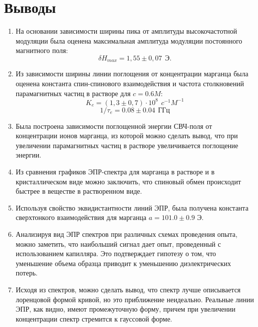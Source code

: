 \documentclass{article}
\begin{document}
\section{Выводы}
\begin{enumerate}
    \item На основании зависимости ширины пика от амплитуды высокочастотной модуляции была оценена максимальная амплитуда модуляции постоянного магнитного поля:
    \begin{equation*}
        \delta H_{max} = 1,55 \pm 0,07 \hspace{5pt} \text{Э}.
    \end{equation*}
    
    \item Из зависимости ширины линии поглощения от концентрации марганца была оценена константа спин-спинового взаимодействия и частота столкновений парамагнитных частиц в растворе для $c = 0.6 M$:
    \begin{equation*}
        K_e = (1,3  \pm 0,7) \cdot 10^8 \hspace{5pt} c^{-1}M^{-1}
    \end{equation*}
    \begin{equation*}
         1/\tau_e = 0.08 \pm 0.04 \hspace{5pt} \text{ГГц}
    \end{equation*}
    \item  Была построена зависимости поглощенной энергии СВЧ-поля от концентрации ионов марганца, из которой можно сделать вывод, что при увеличении парамагнитных частиц в растворе увеличивается поглощение энергии. 
    
    \item Из сравнения графиков ЭПР-спектра для марганца в растворе и в кристаллическом виде можно заключить, что спиновый обмен происходит быстрее в веществе в растворенном виде.
    
    \item Используя свойство эквидистантности линий ЭПР, была получена константа сверхтонкого взаимодействия для марганца $a = 101.0 \pm 0.9$ Э.
    
    \item Анализируя вид ЭПР спектров при различных схемах проведения опыта, можно заметить, что наибольший сигнал дает опыт, проведенный с использованием капилляра. Это подтверждает гипотезу о том, что уменьшение объема образца приводит к уменьшению диэлектрических потерь.
    
    \item Исходя из спектров, можно сделать вывод, что спектр лучше описывается лоренцовой формой кривой, но это приближение неидеально. Реальные линии ЭПР, как видно, имеют промежуточную форму, причем при увеличении концентрации спектр стремится к гауссовой форме.
\end{enumerate}
\end{document}
